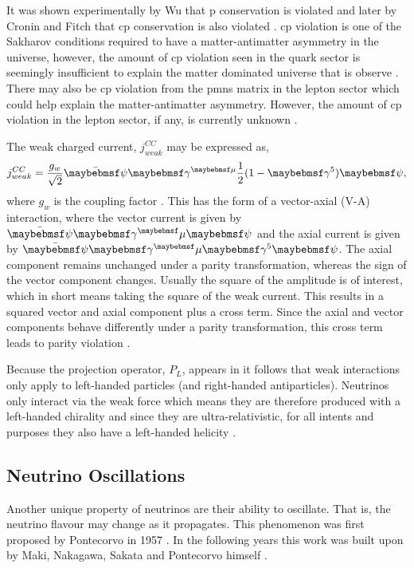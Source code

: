 It was shown experimentally by Wu that \gls{p} conservation is violated and later by Cronin and Fitch that \gls{cp} conservation is also violated \cite{Wu_experiment}\cite{Cronin_and_Fitch_experiment}. \gls{cp} violation is one of the Sakharov conditions required to have a matter-antimatter asymmetry in the universe, however, the amount of \gls{cp} violation seen in the quark sector is seemingly insufficient to explain the matter dominated universe that is  observe \cite{Sakharov_conditions}. There may also be \gls{cp} violation from the \gls{pmns} matrix in the lepton sector which could help explain the matter-antimatter asymmetry. However, the amount of \gls{cp} violation in the lepton sector, if any, is currently unknown \cite{leptonic_cp_violation}.  

The weak charged current, $j^{CC}_{weak}$ may be expressed as, 
\begin{equation}\label{eqn:weak current}
    j^{CC}_{weak} = \frac{g_w}{\sqrt{2}}\Bar{\psi}\gamma^{\mu}\frac{1}{2}(1-\gamma^5)\psi,
\end{equation}
where $g_w$ is the coupling factor \cite{Particles_and_Fundamental_Interactions:_An_Introduction_to_Particle_Physics}.
This has the form of a vector-axial (V-A) interaction, where the vector current is given by $\Bar{\psi}\gamma^\mu\psi$ and the axial current is given by $\Bar{\psi}\gamma^\mu\gamma^5\psi$. The axial component remains unchanged under a parity transformation, whereas the sign of the vector component changes. Usually the square of the amplitude is of interest, which in short means taking the square of the weak current. This results in a squared vector and axial component plus a cross term. Since the axial and vector components behave differently under a parity transformation, this cross term leads to parity violation \cite{Fundamentals_of_Neutrino_Physics_and_Astrophysics}. 

Because the projection operator, $P_L$, appears in  it follows that weak interactions only apply to left-handed particles (and right-handed antiparticles). Neutrinos only interact via the weak force which means they are therefore produced with a left-handed chirality and since they are ultra-relativistic, for all intents and purposes they also have a left-handed helicity \cite{Quarks_and_Leptons:_An_Introductor_Course_in_Modern_Particle_Physics_book}. 

\subsection{Neutrino Oscillations}\label{subsec:Neutrino Oscillations}
Another unique property of neutrinos are their ability to oscillate. That is, the neutrino flavour may change as it propagates. This phenomenon was first proposed by Pontecorvo in 1957 \cite{Pontecorvo}. In the following years this work was built upon by Maki, Nakagawa, Sakata and Pontecorvo himself \cite{MNS_oscillations}. 

